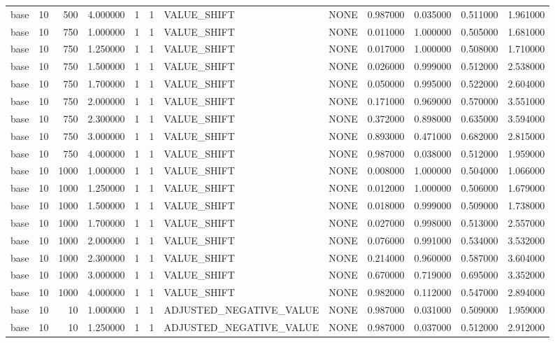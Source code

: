 \begin{tabular}{lrrrllllrrrr}
base & 10 & 500 & 4.000000 & 1 & 1 & VALUE_SHIFT & NONE & 0.987000 & 0.035000 & 0.511000 & 1.961000 \\
base & 10 & 750 & 1.000000 & 1 & 1 & VALUE_SHIFT & NONE & 0.011000 & 1.000000 & 0.505000 & 1.681000 \\
base & 10 & 750 & 1.250000 & 1 & 1 & VALUE_SHIFT & NONE & 0.017000 & 1.000000 & 0.508000 & 1.710000 \\
base & 10 & 750 & 1.500000 & 1 & 1 & VALUE_SHIFT & NONE & 0.026000 & 0.999000 & 0.512000 & 2.538000 \\
base & 10 & 750 & 1.700000 & 1 & 1 & VALUE_SHIFT & NONE & 0.050000 & 0.995000 & 0.522000 & 2.604000 \\
base & 10 & 750 & 2.000000 & 1 & 1 & VALUE_SHIFT & NONE & 0.171000 & 0.969000 & 0.570000 & 3.551000 \\
base & 10 & 750 & 2.300000 & 1 & 1 & VALUE_SHIFT & NONE & 0.372000 & 0.898000 & 0.635000 & 3.594000 \\
base & 10 & 750 & 3.000000 & 1 & 1 & VALUE_SHIFT & NONE & 0.893000 & 0.471000 & 0.682000 & 2.815000 \\
base & 10 & 750 & 4.000000 & 1 & 1 & VALUE_SHIFT & NONE & 0.987000 & 0.038000 & 0.512000 & 1.959000 \\
base & 10 & 1000 & 1.000000 & 1 & 1 & VALUE_SHIFT & NONE & 0.008000 & 1.000000 & 0.504000 & 1.066000 \\
base & 10 & 1000 & 1.250000 & 1 & 1 & VALUE_SHIFT & NONE & 0.012000 & 1.000000 & 0.506000 & 1.679000 \\
base & 10 & 1000 & 1.500000 & 1 & 1 & VALUE_SHIFT & NONE & 0.018000 & 0.999000 & 0.509000 & 1.738000 \\
base & 10 & 1000 & 1.700000 & 1 & 1 & VALUE_SHIFT & NONE & 0.027000 & 0.998000 & 0.513000 & 2.557000 \\
base & 10 & 1000 & 2.000000 & 1 & 1 & VALUE_SHIFT & NONE & 0.076000 & 0.991000 & 0.534000 & 3.532000 \\
base & 10 & 1000 & 2.300000 & 1 & 1 & VALUE_SHIFT & NONE & 0.214000 & 0.960000 & 0.587000 & 3.604000 \\
base & 10 & 1000 & 3.000000 & 1 & 1 & VALUE_SHIFT & NONE & 0.670000 & 0.719000 & 0.695000 & 3.352000 \\
base & 10 & 1000 & 4.000000 & 1 & 1 & VALUE_SHIFT & NONE & 0.982000 & 0.112000 & 0.547000 & 2.894000 \\
base & 10 & 10 & 1.000000 & 1 & 1 & ADJUSTED_NEGATIVE_VALUE & NONE & 0.987000 & 0.031000 & 0.509000 & 1.959000 \\
base & 10 & 10 & 1.250000 & 1 & 1 & ADJUSTED_NEGATIVE_VALUE & NONE & 0.987000 & 0.037000 & 0.512000 & 2.912000 \\

\end{tabular}
